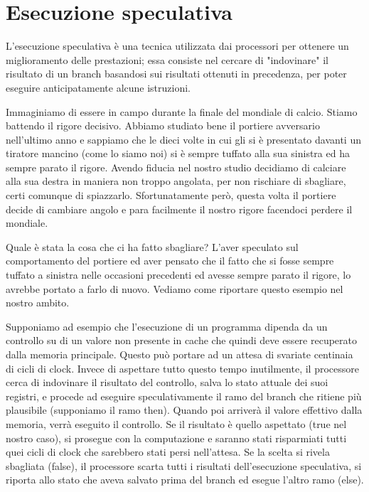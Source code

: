 	\section{Esecuzione speculativa}
		L'esecuzione speculativa è una tecnica utilizzata dai processori per ottenere un miglioramento delle prestazioni; essa consiste nel cercare di "indovinare" il risultato di un branch basandosi sui risultati ottenuti in precedenza, per poter eseguire anticipatamente alcune istruzioni.
		
		Immaginiamo di essere in campo durante la finale del mondiale di calcio. Stiamo battendo il rigore decisivo. Abbiamo studiato bene il portiere avversario nell'ultimo anno e sappiamo che le dieci volte in cui gli si è presentato davanti un tiratore mancino (come lo siamo noi) si è sempre tuffato alla sua sinistra ed ha sempre parato il rigore. Avendo fiducia nel nostro studio decidiamo di calciare alla sua destra in maniera non troppo angolata, per non rischiare di sbagliare, certi comunque di spiazzarlo. Sfortunatamente però, questa volta il portiere decide di cambiare angolo e para facilmente il nostro rigore facendoci perdere il mondiale.
		
		Quale è stata la cosa che ci ha fatto sbagliare? L'aver speculato sul comportamento del portiere ed aver pensato che il fatto che si fosse sempre tuffato a sinistra nelle occasioni precedenti ed avesse sempre parato il rigore, lo avrebbe portato a farlo di nuovo. Vediamo come riportare questo esempio nel nostro ambito. 
		
		Supponiamo ad esempio che l'esecuzione di un programma dipenda da un controllo su di un valore non presente in cache che quindi deve essere recuperato dalla memoria principale. Questo può portare ad un attesa di svariate centinaia di cicli di clock. Invece di aspettare tutto questo tempo inutilmente, il processore cerca di indovinare il risultato del controllo, salva lo stato attuale dei suoi registri, e procede ad eseguire speculativamente il ramo del branch che ritiene più plausibile (supponiamo il ramo then). Quando poi arriverà il valore effettivo dalla memoria, verrà eseguito il controllo. Se il risultato è quello aspettato (true nel nostro caso), si prosegue con la computazione e saranno stati risparmiati tutti quei cicli di clock che sarebbero stati persi nell'attesa. Se la scelta si rivela sbagliata (false), il processore scarta tutti i risultati dell'esecuzione speculativa, si riporta allo stato che aveva salvato prima del branch ed esegue l'altro ramo (else).
		
